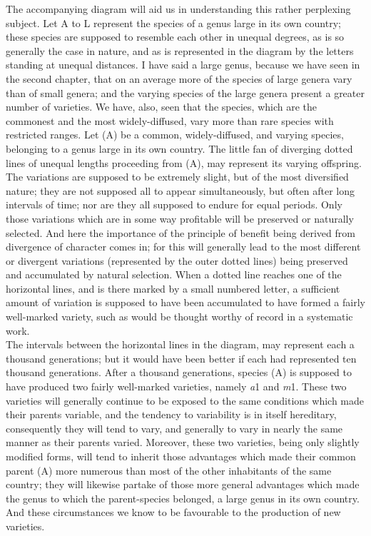 \indent The accompanying diagram will aid us in understanding this rather perplexing subject. Let A to L represent the species of a genus large in its own country; these species are supposed to resemble each other in unequal degrees, as is so generally the case in nature, and as is represented in the diagram by the letters standing at unequal distances. I have said a large genus, because we have seen in the second chapter, that on an average more of the species of large genera vary than of small genera; and the varying species of the large genera present a greater number of varieties. We have, also, seen that the species, which are the commonest and the most widely-diffused, vary more than rare species with restricted ranges. Let (A) be a common, widely-diffused, and varying species, belonging to a genus large in its own country. The little fan of diverging dotted lines of unequal lengths proceeding from (A), may represent its varying offspring. The variations are supposed to be extremely slight, but of the most diversified nature; they are not supposed all to appear simultaneously, but often after long intervals of time; nor are they all supposed to endure for equal periods.  Only those variations which are in some way profitable will be preserved or naturally selected. And here the importance of the principle of benefit being derived from divergence of character comes in; for this will generally lead to the most different or divergent variations (represented by the outer dotted lines) being preserved and accumulated by natural selection. When a dotted line reaches one of the horizontal lines, and is there marked by a small numbered letter, a sufficient amount of variation is supposed to have been accumulated to have formed a fairly well-marked variety, such as would be thought worthy of record in a systematic work. \\
\indent The intervals between the horizontal lines in the diagram, may represent each a thousand generations; but it would have been better if each had represented ten thousand generations. After a thousand generations, species (A) is supposed to have produced two fairly well-marked varieties, namely \emph{a}1 and \emph{m}1. These two varieties will generally continue to be exposed to the same conditions which made their parents variable, and the tendency to variability is in itself hereditary, consequently they will tend to vary, and generally to vary in nearly the same manner as their parents varied. Moreover, these two varieties, being only slightly modified forms, will tend to inherit those advantages which made their common parent (A) more numerous than most of the other inhabitants of the same country; they will likewise partake of those more general advantages which made the genus to which the parent-species belonged, a large genus in its own country. And these circumstances we know to be favourable to the production of new varieties. \\
